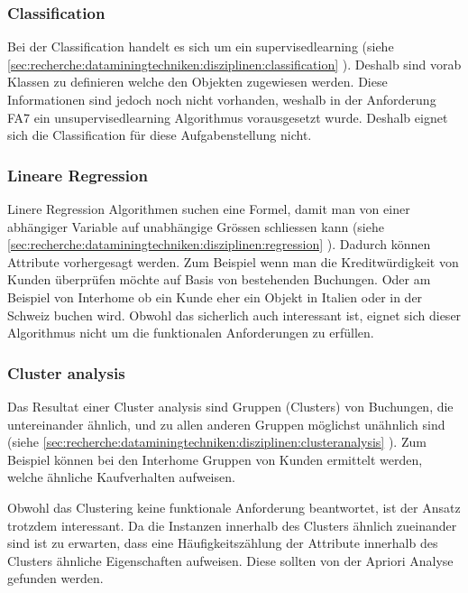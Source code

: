 \subsubsection{Classification}
\label{sec:konzept:disziplinauswahl:classification}
Bei der Classification handelt es sich um ein \gls{supervisedlearning} (siehe \cref{sec:recherche:dataminingtechniken:disziplinen:classification} ). Deshalb sind vorab Klassen zu definieren welche den Objekten zugewiesen werden. Diese Informationen sind jedoch noch nicht vorhanden, weshalb in der Anforderung FA7 ein \gls{unsupervisedlearning} Algorithmus vorausgesetzt wurde. Deshalb eignet sich die Classification für diese Aufgabenstellung nicht.

\subsubsection{Lineare Regression}
\label{sec:konzept:disziplinauswahl:regression}
Linere Regression Algorithmen suchen eine Formel, damit man von einer abhängiger Variable auf unabhängige Grössen schliessen kann (siehe \cref{sec:recherche:dataminingtechniken:disziplinen:regression} ). Dadurch können Attribute vorhergesagt werden. Zum Beispiel wenn man die Kreditwürdigkeit von Kunden überprüfen möchte auf Basis von bestehenden Buchungen. Oder am Beispiel von Interhome ob ein Kunde eher ein Objekt in Italien oder in der Schweiz buchen wird. Obwohl das sicherlich auch interessant ist, eignet sich dieser Algorithmus nicht um die funktionalen Anforderungen zu erfüllen.

\subsubsection{Cluster analysis}
\label{sec:konzept:disziplinauswahl:clusteranalysis}
Das Resultat einer Cluster analysis sind Gruppen (Clusters) von Buchungen, die untereinander ähnlich, und zu allen anderen Gruppen möglichst unähnlich sind (siehe \cref{sec:recherche:dataminingtechniken:disziplinen:clusteranalysis} ). Zum Beispiel können bei den Interhome Gruppen von Kunden ermittelt werden, welche ähnliche Kaufverhalten aufweisen. 

Obwohl das Clustering keine funktionale Anforderung beantwortet, ist der Ansatz trotzdem interessant. Da die Instanzen innerhalb des Clusters ähnlich zueinander sind ist zu erwarten, dass eine Häufigkeitszählung der Attribute innerhalb des Clusters ähnliche Eigenschaften aufweisen. Diese sollten von der Apriori Analyse gefunden werden. 

